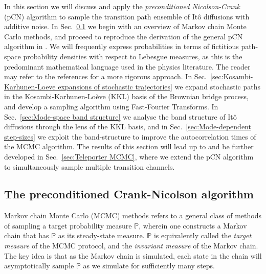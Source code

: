 In this section we will discuss and apply the \textit{preconditioned Nicolson-Crank} (pCN) algorithm to sample the transition path ensemble of It\^{o} diffusions with additive noise. In Sec.~\ref{sec:The preconditioned Crank-Nicolson algorithm} we begin with an overview of Markov chain Monte Carlo methods, and proceed to reproduce the derivation of the general pCN algorithm in \citep{cotterMCMCMethodsFunctions2013, beskosMCMCMETHODSDIFFUSION2008, hairerAnalysisSPDEsArising2005, hairerAnalysisSPDEsArising2007, hairerSpectralGapsMetropolis2014}. We will frequently express probabilities in terms of fictitious path-space probability densities with respect to Lebesgue measures, as this is the predominant mathematical language used in the physics literature. The reader may refer to the references for a more rigorous approach. In Sec.~\ref{sec:Kosambi-Karhunen-Loeve expansions of stochastic trajectories} we expand stochastic paths in the Kosambi-Karhunen-Lo\`eve (KKL) basis of the Brownian bridge process, and develop a sampling algorithm using Fast-Fourier Transforms. In Sec.~\ref{sec:Mode-space band structure} we analyse the band structure of It\^{o} diffusions through the lens of the KKL basis, and in Sec.~\ref{sec:Mode-dependent step-sizes} we exploit the band-structure to improve the autocorrelation times of the MCMC algorithm. The results of this section will lead up to and be further developed in Sec.~\ref{sec:Teleporter MCMC}, where we extend the pCN algorithm to simultaneously sample multiple transition channels. 

\subsection{The preconditioned Crank-Nicolson algorithm} \label{sec:The preconditioned Crank-Nicolson algorithm}
 
Markov chain Monte Carlo (MCMC) methods refers to a general class of methods of sampling a target probability measure $\mathbb{P}$, wherein one constructs a Markov chain that has $\mathbb{P}$ as its steady-state measure. $\mathbb{P}$ is equivalently called the \textit{target measure} of the MCMC protocol, and the \textit{invariant measure} of the Markov chain. The key idea is that as the Markov chain is simulated, each state in the chain will asymptotically sample $\mathbb{P}$ as we simulate for sufficiently many steps.

